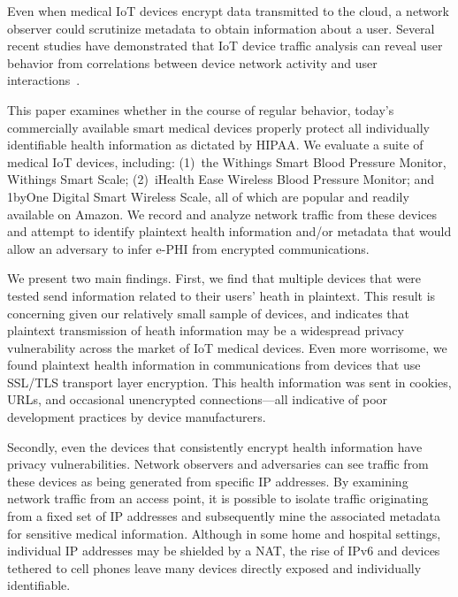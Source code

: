 Even when medical IoT devices encrypt data transmitted to the cloud, a network
observer could scrutinize metadata to obtain information about a user.
Several recent studies have demonstrated that IoT device traffic analysis can
reveal user behavior  from correlations between device network activity and
user interactions~\cite{apthorpeIoT}.

This paper examines whether in the course of regular behavior, today's
commercially available smart medical devices properly protect all individually
identifiable health information as dictated by HIPAA.  We evaluate a suite of
medical IoT devices, including: (1)~the Withings Smart Blood Pressure Monitor,
Withings Smart Scale; (2)~iHealth Ease Wireless Blood Pressure Monitor; and 1byOne
Digital Smart Wireless Scale, all of which are popular and readily available
on Amazon. We record and analyze network traffic from these devices and
attempt to identify plaintext health information and/or metadata that would
allow an adversary to infer e-PHI from encrypted communications.

We present two main findings. First, we find that multiple devices that were
tested send information related to their users' heath in plaintext. This
result is concerning given our relatively small sample of devices, and
indicates that plaintext transmission of heath information may be a widespread
privacy vulnerability across the market of IoT medical devices. Even more
worrisome, we found plaintext health information in communications from
devices that use SSL/TLS transport layer encryption. This health information
was sent in cookies, URLs, and occasional unencrypted connections---all
indicative of poor development practices by device manufacturers.

Secondly, even the devices that consistently encrypt health information have privacy
vulnerabilities. Network observers and adversaries can see
traffic from these devices as being generated from specific IP addresses. By
examining network traffic from an access point, it is possible to isolate
traffic originating from a fixed set of IP addresses and subsequently mine the
associated metadata for sensitive medical information. Although in some home and
hospital settings, individual IP addresses may be shielded by a NAT, the rise
of IPv6 and devices tethered to cell phones leave many devices directly exposed
and individually identifiable.

